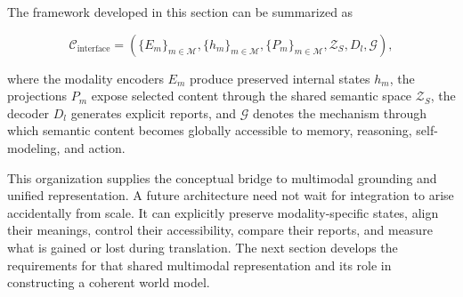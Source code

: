 The framework developed in this section can be summarized as

\begin{equation}
\mathcal{C}_{\mathrm{interface}}
=
\left(
\{E_m\}_{m\in\mathcal{M}},
\{h_m\}_{m\in\mathcal{M}},
\{P_m\}_{m\in\mathcal{M}},
\mathcal{Z}_{S},
D_l,
\mathcal{G}
\right),
\label{eq:semantic-interface-architecture}
\end{equation}

where the modality encoders $E_m$ produce preserved internal states $h_m$, the projections $P_m$ expose selected content through the shared semantic space $\mathcal{Z}_{S}$, the decoder $D_l$ generates explicit reports, and $\mathcal{G}$ denotes the mechanism through which semantic content becomes globally accessible to memory, reasoning, self-modeling, and action.

This organization supplies the conceptual bridge to multimodal grounding and unified representation. A future architecture need not wait for integration to arise accidentally from scale. It can explicitly preserve modality-specific states, align their meanings, control their accessibility, compare their reports, and measure what is gained or lost during translation. The next section develops the requirements for that shared multimodal representation and its role in constructing a coherent world model.


